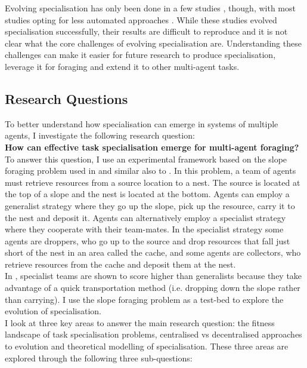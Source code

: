 \documentclass[12pt]{article}
\begin{document}
Evolving specialisation has only been done in a few studies \cite{ferrante:PLOS_CB:2015, nitschke:SEC:2012}, though, with most studies opting for less automated approaches \cite{hamann:Springer:2018}.
While these studies evolved specialisation successfully, their results are difficult to reproduce and it is not clear what the core challenges of evolving specialisation are.
Understanding these challenges can make it easier for future research to produce specialisation, leverage it for foraging and extend it to other multi-agent tasks.

\subsection{Research Questions}

To better understand how specialisation can emerge in systems of multiple agents, I investigate the following research question:\\

\textbf{How can effective task specialisation emerge for multi-agent foraging?}\\

To answer this question, I use an experimental framework based on the slope foraging problem used in \cite{ferrante:PLOS_CB:2015} and similar also to \cite{pini:ICSI:2012, pini:Swarm_Intelligence:2011}.
In this problem, a team of agents must retrieve resources from a source location to a nest.
The source is located at the top of a slope and the nest is located at the bottom.
Agents can employ a generalist strategy where they go up the slope, pick up the resource, carry it to the nest and deposit it.
Agents can alternatively employ a specialist strategy where they cooperate with their team-mates.
In the specialist strategy some agents are droppers, who go up to the source and drop resources that fall just short of the nest in an area called the cache, and some agents are collectors, who retrieve resources from the cache and deposit them at the nest.\\

In \cite{pini:ICSI:2012, pini:Swarm_Intelligence:2011,ferrante:PLOS_CB:2015}, specialist teams are shown to score higher than generalists because they take advantage of a quick transportation method (i.e. dropping down the slope rather than carrying).
I use the slope foraging problem as a test-bed to explore the evolution of specialisation.\\

I look at three key areas to answer the main research question: the fitness landscape of task specialisation problems, centralised vs decentralised approaches to evolution and theoretical modelling of specialisation.
These three areas are explored through the following three sub-questions:\\
\end{document}
